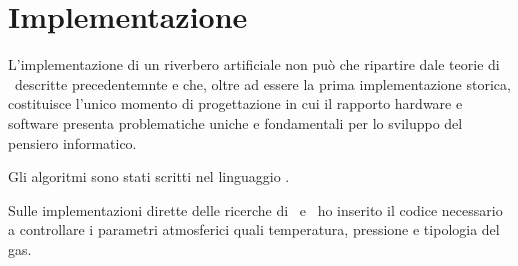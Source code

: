 
\chapter{Implementazione}
\label{chp:Implementazione}

L'implementazione di un riverbero artificiale non può che ripartire dale teorie
di \ms~descritte precedentemnte e che, oltre ad essere la prima
implementazione storica, costituisce l'unico momento di progettazione in cui
il rapporto hardware e software presenta problematiche uniche e fondamentali per
lo sviluppo del pensiero informatico.

Gli algoritmi sono stati scritti nel linguaggio \faust.

Sulle implementazioni dirette delle ricerche di \ms~e \jam~ho inserito il codice
necessario a controllare i parametri atmosferici quali temperatura, pressione e
tipologia del gas.

\clearpage

\clearpage

\clearpage


